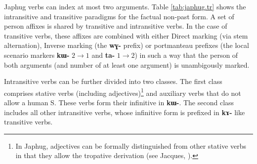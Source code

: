\documentclass[oneside,a4paper,11pt]{article}
\newcommand{\ipa}[1]{{\phon\textbf{\mbox{#1}}}} %
\begin{document}
Japhug verbs can index at most two arguments. Table \ref{tab:japhug.tr} shows the intransitive and transitive paradigms for the factual non-past form. A set of person affixes is shared by transitive and intransitive verbs. In the case of transitive verbs, these affixes are combined with either Direct marking (via stem alternation), Inverse marking (the \ipa{wɣ-} prefix) or portmanteau prefixes (the local scenario markers \ipa{kɯ-} $2\rightarrow1$ and \ipa{ta-} $1\rightarrow2$) in such a way that the person of both arguments (and number of at least one argument) is unambigously marked.

Intransitive verbs can be further divided into two classes. The first class comprises stative verbs (including adjectives)\footnote{In Japhug, adjectives can be formally distinguished from other stative verbs in that they allow the tropative derivation (see Jacques, \citeyear{jacques13tropative}).} and auxiliary verbs that do not allow a human S. These verbs form their infinitive in \ipa{kɯ-}. The second class includes all other intransitive verbs, whose infinitive form is prefixed in \ipa{kɤ-} like transitive verbs.
\end{document}
